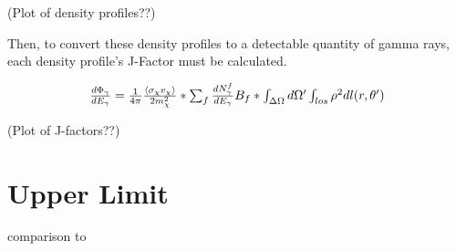 (Plot of density profiles??)


Then, to convert these density profiles to a detectable quantity of gamma rays, each density profile's J-Factor must be calculated.


\begin{equation} \label{eqn:jfactor}
$$ \frac{d \Phi_{\gamma}}{d E_{\gamma}} = \frac{1}{4\pi} \frac{ \langle \sigma_{\chi} v_{\chi} \rangle }{2 m^{2}_{\chi}} * \sum_{f} \frac{ d N_{\gamma}^{f} }{d E_{\gamma} } B_{f} * \int_{ \Delta \Omega } d \Omega' \int_{los} \rho^{2} d l( r, \theta' )  $$
\end{equation}


(Plot of J-factors??)


\section{Upper Limit}

comparison to 

